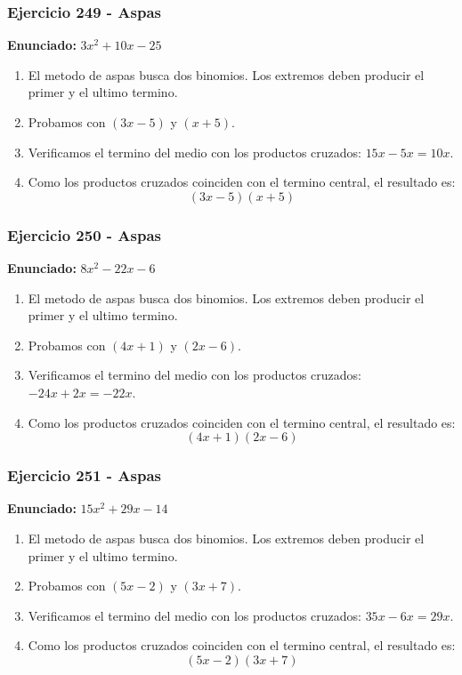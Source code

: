 \documentclass[11pt,a4paper]{article}
\begin{document}
\vspace{0.2cm}
\subsubsection*{Ejercicio 249 - Aspas}
\textbf{Enunciado:} $ 3 x^{2} + 10 x - 25 $\par
\begin{enumerate}[leftmargin=2em]
\item El metodo de aspas busca dos binomios. Los extremos deben producir el primer y el ultimo termino.
\item Probamos con \((3 x - 5)\) y \((x + 5)\).
\item Verificamos el termino del medio con los productos cruzados: \(15 x- 5 x=10 x\).
\item Como los productos cruzados coinciden con el termino central, el resultado es: \[\boxed{\left(3 x - 5\right)\left(x + 5\right)}\]
\end{enumerate}

\vspace{0.2cm}
\subsubsection*{Ejercicio 250 - Aspas}
\textbf{Enunciado:} $ 8 x^{2} - 22 x - 6 $\par
\begin{enumerate}[leftmargin=2em]
\item El metodo de aspas busca dos binomios. Los extremos deben producir el primer y el ultimo termino.
\item Probamos con \((4 x + 1)\) y \((2 x - 6)\).
\item Verificamos el termino del medio con los productos cruzados: \(- 24 x+2 x=- 22 x\).
\item Como los productos cruzados coinciden con el termino central, el resultado es: \[\boxed{\left(4 x + 1\right)\left(2 x - 6\right)}\]
\end{enumerate}

\vspace{0.2cm}
\subsubsection*{Ejercicio 251 - Aspas}
\textbf{Enunciado:} $ 15 x^{2} + 29 x - 14 $\par
\begin{enumerate}[leftmargin=2em]
\item El metodo de aspas busca dos binomios. Los extremos deben producir el primer y el ultimo termino.
\item Probamos con \((5 x - 2)\) y \((3 x + 7)\).
\item Verificamos el termino del medio con los productos cruzados: \(35 x- 6 x=29 x\).
\item Como los productos cruzados coinciden con el termino central, el resultado es: \[\boxed{\left(5 x - 2\right)\left(3 x + 7\right)}\]
\end{enumerate}
\end{document}
